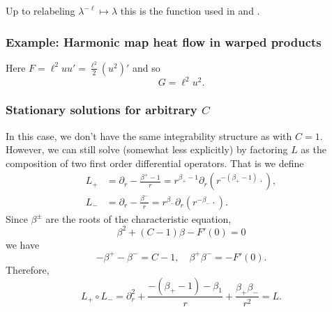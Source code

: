 \documentclass{amsart}
\begin{document}
Up to relabeling \(\lambda^{-\ell} \mapsto \lambda\) this is the function used in \cite{MR1180392} and \cite{MR2332425}.

\subsubsection*{Example: Harmonic map heat flow in warped products}

Here \(F = \ell^2 uu' = \tfrac{\ell^2}{2} (u^2)'\) and so
\[
G = \ell^2 u^2.
\]

\subsubsection*{Stationary solutions for arbitrary \(C\)}

In this case, we don't have the same integrability structure as with \(C = 1\). However, we can still solve (somewhat less explicitly) by factoring \(L\) as the composition of two first order differential operators. That is we define
\begin{align*}
L_+ &= \partial_r - \frac{\beta^+ - 1}{r} = r^{\beta_+ - 1} \partial_r (r^{-(\beta_+ - 1)} \cdot) , \\
L_- &= \partial_r - \frac{\beta^-}{r} = r^{\beta_-} \partial_r (r^{-\beta_-} \cdot).
\end{align*}
Since \(\beta^{\pm}\) are the roots of the characteristic equation,
\[
\beta^2 + (C - 1) \beta - F'(0) = 0
\]
we have
\[
- \beta^+ - \beta^- = C-1, \quad \beta^+ \beta^- = -F'(0).
\]
Therefore,
\[
L_+ \circ L_- = \partial_r^2 + \frac{-(\beta_+ - 1) -\beta_1}{r} + \frac{\beta_+ \beta_-}{r^2} = L.
\]
\end{document}
